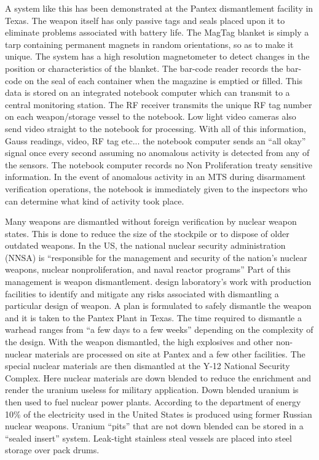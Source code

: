 \documentclass[twoside,titlepage,11pt,twocolumn,a4paper]{article}
\begin{document}
A system like this has been demonstrated at the Pantex dismantlement
facility in Texas. The weapon itself has only passive tags and seals
placed upon it to eliminate problems associated with battery life. The
MagTag blanket is simply a tarp containing permanent magnets in random
orientations, so as to make it unique. The system has a high
resolution magnetometer to detect changes in the position or
characteristics of the blanket. The bar-code reader records the
bar-code on the seal of each container when the magazine is emptied or
filled. This data is stored on an integrated notebook computer which
can transmit to a central monitoring station. The RF receiver
transmits the unique RF tag number on each weapon/storage vessel to
the notebook. Low light video cameras also send video straight to the
notebook for processing. With all of this information, Gauss readings,
video, RF tag etc... the notebook computer sends an ``all okay'' signal
once every second assuming no anomalous activity is detected from any
of the sensors. The notebook computer records no Non Proliferation
treaty sensitive information.  In the event of anomalous activity in
an MTS during disarmament verification operations, the notebook is
immediately given to the inspectors who can determine what kind of
activity took place. \citep{gerdes2001}

Many weapons are dismantled without foreign verification by nuclear
weapon states.  This is done to reduce the size of the stockpile or to
dispose of older outdated weapons.  In the US, the national nuclear
security administration (NNSA) is ``responsible for the management and
security of the nation's nuclear weapons, nuclear nonproliferation,
and naval reactor programs'' \citep{gerdes2001} Part of this management is weapon
dismantlement. design laboratory's work with production facilities to
identify and mitigate any risks associated with dismantling a
particular design of weapon. A plan is formulated to safely dismantle
the weapon and it is taken to the Pantex Plant in Texas. The time
required to dismantle a warhead ranges from ``a few days to a few
weeks'' depending on the complexity of the design.\citep{ourMissionNNSA} With the weapon
dismantled, the high explosives and other non-nuclear materials are
processed on site at Pantex and a few other facilities.  The special
nuclear materials are then dismantled at the Y-12 National Security
Complex.  \citep{pantex2010} Here nuclear materials are down blended to reduce the
enrichment and render the uranium useless for military
application. Down blended uranium is then used to fuel nuclear power
plants. According to the department of energy 10\% of the electricity
used in the United States is produced using former Russian nuclear
weapons. \citep{dismantlementNNSA} Uranium ``pits'' that are not down blended can be stored
in a ``sealed insert'' system. Leak-tight stainless steal vessels are
placed into steel storage over pack drums.
\end{document}
